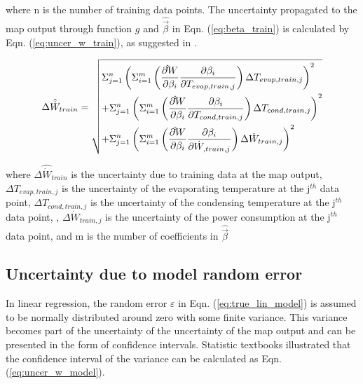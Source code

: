 where n is the number of training data points. The uncertainty propagated to the map output through function $g$ and $\hat{ \vec {\beta}}$ in Eqn. (\ref{eq:beta_train}) is calculated by Eqn. (\ref{eq:uncer_w_train}), as suggested in \cite{song:2013}.

\begin{equation}
\Delta {\hat{\dot{W}}_{train}} = \sqrt{\begin{gathered}
  \Sigma_{j=1}^n\left(\Sigma _{i = 1}^m\left(\frac{{\partial \hat \dot W}}{{\partial {\beta _i}}}\frac{{\partial {\beta _i}}}{{\partial {T_{evap,train,j}}}}\right)\Delta {T_{evap,train,j}}\right)^2  \hfill \\
  +\Sigma_{j=1}^n\left(\Sigma _{i = 1}^m\left(\frac{{\partial \hat \dot W}}{{\partial {\beta _i}}}\frac{{\partial {\beta _i}}}{{\partial {T_{cond,train,j}}}}\right)\Delta {T_{cond,train,j}}\right)^2 \hfill \\
   +\Sigma_{j=1}^n\left(\Sigma _{i = 1}^m\left(\frac{{\partial \hat \dot W}}{{\partial {\beta _i}}}\frac{{\partial {\beta _i}}}{{\partial {\dot{W}_{,train,j}}}}\right)\Delta {\dot{W}_{train,j}}\right)^2 \hfill \\ 
\end{gathered}}
\label{eq:uncer_w_train}
\end{equation}

where $\Delta {\hat{\dot{W}}_{train}}$ is the uncertainty due to training data at the map output, $\Delta {T_{evap,train,j}}$ is the uncertainty of the evaporating temperature at the j$^{th}$ data point, $\Delta {T_{cond,train,j}}$ is the uncertainty of the condensing temperature at the j$^{th}$ data point, , $\Delta {\dot{W}_{train,j}}$ is the uncertainty of the power consumption at the j$^{th}$ data point, and m is the number of coefficients in $\hat{\vec{\beta}}$

\subsection{Uncertainty due to model random error} \label{subsec:uncer_model}

In linear regression, the random error $\varepsilon$ in Eqn. (\ref{eq:true_lin_model}) is assumed to be normally distributed around zero with some finite variance. This variance becomes part of the uncertainty of the uncertainty of the map output and can be presented in the form of confidence intervals. Statistic textbooks \cite{Montgomery:2005,Graybill:1994} illustrated that the confidence interval of the variance can be calculated as Eqn. (\ref{eq:uncer_w_model}).

